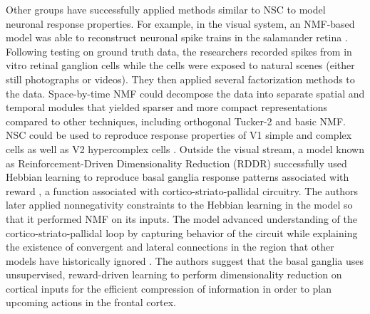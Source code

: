 Other groups have successfully applied methods similar to \ac{NSC} to model neuronal response properties. For example, in the visual system, an \ac{NMF}-based model was able to reconstruct neuronal spike trains in the salamander retina \citep{Onken2016}. Following testing on ground truth data, the researchers recorded spikes from in vitro retinal ganglion cells  while the cells were exposed to natural scenes (either still photographs or videos). They then applied several factorization methods to the data. Space-by-time NMF could decompose the data into separate spatial and temporal modules that yielded sparser and more compact representations compared to other techniques, including orthogonal Tucker-2 and basic \ac{NMF}. \ac{NSC} could be used to reproduce response properties of \ac{V1} simple and complex cells \citep{HoyerHyvarinen2002,Hoyer2003} as well as V2 hypercomplex cells \citep{Hyvarinen2005}. Outside the visual stream, a model known as Reinforcement-Driven Dimensionality Reduction (RDDR) successfully used Hebbian learning to reproduce basal ganglia response patterns associated with reward \citep{BarGad2000}, a function associated with cortico-striato-pallidal circuitry. The authors later applied nonnegativity constraints to the Hebbian learning in the model so that it performed \ac{NMF} on its inputs. The model advanced understanding of the cortico-striato-pallidal loop by capturing behavior of the circuit while explaining the existence of convergent and lateral connections in the region that other models have historically ignored \citep{BarGad2003_Review}. The authors suggest that the basal ganglia uses unsupervised, reward-driven learning to perform dimensionality reduction on cortical inputs for the efficient compression of information in order to plan upcoming actions in the frontal cortex.







